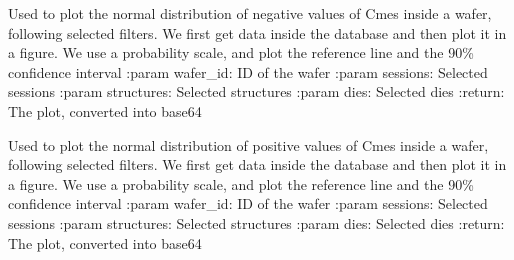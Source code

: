\documentclass[letterpaper,10pt,english]{sphinxmanual}
\begin{document}

\begin{fulllineitems}
\label{\detokenize{normal_plots:normal_plots.Cmes_normal_distrib_neg}}
\pysigstartsignatures
{}
\pysigstopsignatures
\sphinxAtStartPar
Used to plot the normal distribution of negative values of Cmes inside a wafer, following selected filters.
We first get data inside the database and then plot it in a figure. We use a probability scale, and plot the reference line and the 90\% confidence interval
:param wafer\_id: ID of the wafer
:param sessions: Selected sessions
:param structures: Selected structures
:param dies: Selected dies
:return: The plot, converted into base64

\end{fulllineitems}


\begin{fulllineitems}
\label{\detokenize{normal_plots:normal_plots.Cmes_normal_distrib_pos}}
\pysigstartsignatures
{}
\pysigstopsignatures
\sphinxAtStartPar
Used to plot the normal distribution of positive values of Cmes inside a wafer, following selected filters.
We first get data inside the database and then plot it in a figure. We use a probability scale, and plot the reference line and the 90\% confidence interval
:param wafer\_id: ID of the wafer
:param sessions: Selected sessions
:param structures: Selected structures
:param dies: Selected dies
:return: The plot, converted into base64

\end{fulllineitems}

\end{document}
